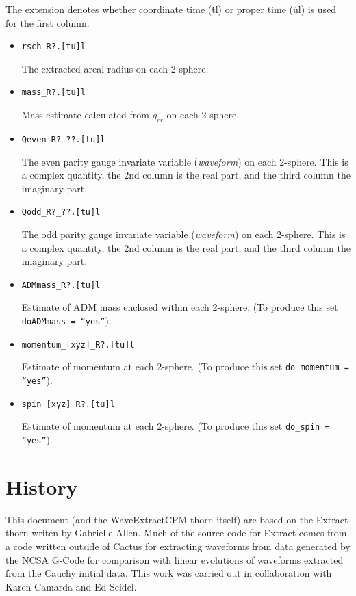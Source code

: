 \documentclass{article}
\begin{document}
The extension denotes whether coordinate time ({\.tl}) or proper time
({\.ul}) is used for the first column.

\begin{itemize}

  \item {\tt rsch\_R?.[tu]l} 

	The extracted areal radius on each 2-sphere.

  \item {\tt mass\_R?.[tu]l}

	Mass estimate calculated from $g_{rr}$ on each 2-sphere.

  \item {\tt Qeven\_R?\_??.[tu]l}

	The even parity gauge invariate variable ({\it waveform}) on 
	each 2-sphere. This is a complex quantity, the 2nd column is 
	the real part, and the third column the imaginary part.

  \item {\tt Qodd\_R?\_??.[tu]l}

	The odd parity gauge invariate variable ({\it waveform}) on 
	each 2-sphere. This is a complex quantity, the 2nd column is 
	the real part, and the third column the imaginary part.

  \item {\tt ADMmass\_R?.[tu]l}

	Estimate of ADM mass enclosed within each 2-sphere.
	(To produce this set {\tt doADMmass = ``yes''}).

  \item {\tt momentum\_[xyz]\_R?.[tu]l}

	Estimate of momentum at each 2-sphere.
	(To produce this set {\tt do\_momentum = ``yes''}).

  \item {\tt spin\_[xyz]\_R?.[tu]l}

	Estimate of momentum at each 2-sphere.
	(To produce this set {\tt do\_spin = ``yes''}).


\end{itemize}

\section{History}
This document (and the WaveExtractCPM thorn itself) are based on the Extract thorn writen by
Gabrielle Allen. Much of the source code for Extract comes from a code written outside of Cactus
for extracting waveforms from data generated by the NCSA G-Code for comparison with linear
evolutions of waveforms extracted from the Cauchy initial data. This work was carried out in
collaboration with Karen Camarda and Ed Seidel.
\end{document}
